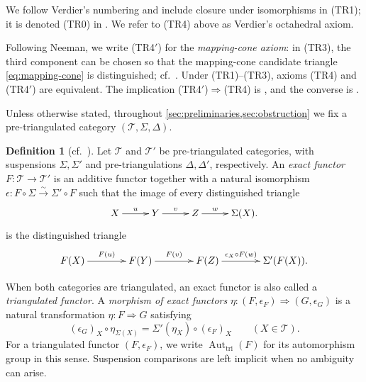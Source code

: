 \documentclass[a4paper,11pt,reqno]{amsart}
\theoremstyle{definition}
\newtheorem{definition}[definition]{Definition}
\theoremstyle{plain}
\numberwithin{equation}{section}
\newcommand{\T}{\mathcal T}
\begin{document}
We follow Verdier's numbering and include closure under isomorphisms in
\textup{(TR1)}; it is denoted \textup{(TR0)} in
\cite[Definition~1.1.2]{Neeman2001}.  We refer to \textup{(TR4)} above as
Verdier's octahedral axiom.

Following Neeman, we write \textup{(TR4$'$)} for the \emph{mapping-cone
axiom}: in \textup{(TR3)}, the third component can be chosen so that the
mapping-cone candidate triangle \eqref{eq:mapping-cone} is distinguished;
cf.~\cite[Definition~1.3.13]{Neeman2001}.  Under
\textup{(TR1)}--\textup{(TR3)}, axioms \textup{(TR4)} and
\textup{(TR4$'$)} are equivalent.  The implication
\textup{(TR4$'$)}$\Rightarrow$\textup{(TR4)} is
\cite[Proposition~1.4.6]{Neeman2001}, and the converse is
\cite[Theorem~1.8]{Neeman1991}.

Unless otherwise stated, throughout \cref{sec:preliminaries,sec:obstruction}
we fix a pre-triangulated category $(\T,\Sigma,\Delta)$.


\begin{definition}[{\normalfont cf.~\cite[Definition~2.1.1]{Neeman2001}}]
\label{def:exact-functor}
Let \(\T\) and \(\T'\) be pre-triangulated categories, with suspensions
\(\Sigma,\Sigma'\) and pre-triangulations \(\Delta,\Delta'\), respectively.
An \emph{exact functor} \(F:\T\to\T'\) is an additive functor
together with a natural isomorphism
$\epsilon:F\circ\Sigma\xrightarrow{\sim}\Sigma'\circ F$
such that the image of every distinguished triangle
\begin{equation*}
\xymatrix@C=2.2pc{
 X\ar[r]^-{u}&Y\ar[r]^-{v}&Z\ar[r]^-{w}&\Sigma(X).
}
\end{equation*}
is the distinguished triangle
\begin{equation*}
\xymatrix@C=3.2pc{
 F(X)\ar[r]^-{F(u)}&F(Y)\ar[r]^-{F(v)}&F(Z)
 \ar[r]^-{\epsilon_X\circ F(w)}&\Sigma'(F(X)).
}
\end{equation*}
\end{definition}

When both categories are triangulated, an exact functor is also called a
\emph{triangulated functor}.  A \emph{morphism of exact functors}
$\eta:(F,\epsilon_F)\Rightarrow(G,\epsilon_G)$ is a natural transformation
$\eta:F\Rightarrow G$ satisfying
\[
 (\epsilon_G)_X\circ\eta_{\Sigma(X)}
 =\Sigma'(\eta_X)\circ(\epsilon_F)_X
 \qquad(X\in\T).
\]
For a triangulated functor $(F,\epsilon_F)$, we write
$\operatorname{Aut}_{\mathrm{tri}}(F)$ for its automorphism group in this
sense.  Suspension comparisons are left implicit when no ambiguity can arise.
\end{document}
